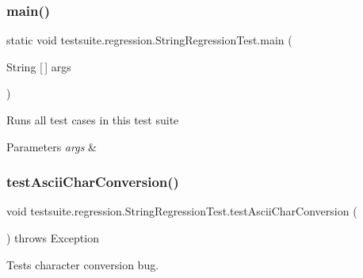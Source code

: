 \subsubsection{\texorpdfstring{main()}{main()}}
{\footnotesize\ttfamily static void testsuite.\+regression.\+String\+Regression\+Test.\+main (\begin{DoxyParamCaption}\item[{String \mbox{[}$\,$\mbox{]}}]{args }\end{DoxyParamCaption})\hspace{0.3cm}{\ttfamily [static]}}

Runs all test cases in this test suite


\begin{DoxyParams}{Parameters}
{\em args} & \\
\hline
\end{DoxyParams}
\mbox{\label{classtestsuite_1_1regression_1_1_string_regression_test_a5a8cfa1befdedece1a323e0b37658e39}} 
\subsubsection{\texorpdfstring{test\+Ascii\+Char\+Conversion()}{testAsciiCharConversion()}}
{\footnotesize\ttfamily void testsuite.\+regression.\+String\+Regression\+Test.\+test\+Ascii\+Char\+Conversion (\begin{DoxyParamCaption}{ }\end{DoxyParamCaption}) throws Exception}

Tests character conversion bug.


